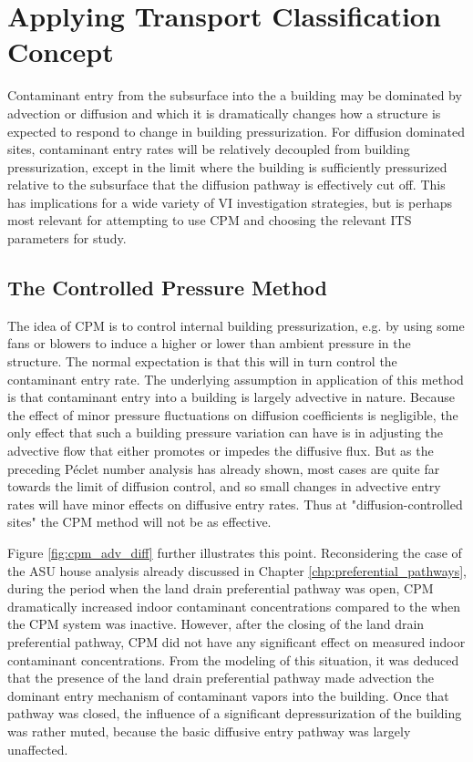 \section{Applying Transport Classification Concept}

Contaminant entry from the subsurface into the a building may be dominated by advection or diffusion and which it is dramatically changes how a structure is expected to respond to change in building pressurization.
For diffusion dominated sites, contaminant entry rates will be relatively decoupled from building pressurization, except in the limit where the building is sufficiently pressurized relative to the subsurface that the diffusion pathway is effectively cut off.
This has implications for a wide variety of VI investigation strategies, but is perhaps most relevant for attempting to use CPM and choosing the relevant ITS parameters for study.\par

\subsection{The Controlled Pressure Method}

The idea of CPM is to control internal building pressurization, e.g. by using some fans or blowers to induce a higher or lower than ambient pressure in the structure.
The normal expectation is that this will in turn control the contaminant entry rate.
The underlying assumption in application of this method is that contaminant entry into a building is largely advective in nature.
Because the effect of minor pressure fluctuations on diffusion coefficients is negligible, the only effect that such a building pressure variation can have is in adjusting the advective flow that either promotes or impedes the diffusive flux.
But as the preceding Péclet number analysis has already shown, most cases are quite far towards the limit of diffusion control, and so small changes in advective entry rates will have minor effects on diffusive entry rates.
Thus at "diffusion-controlled sites" the CPM method will not be as effective.\par

Figure \ref{fig:cpm_adv_diff} further illustrates this point.
Reconsidering the case of the ASU house analysis already discussed in Chapter \ref{chp:preferential_pathways}, during the period when the land drain preferential pathway was open, CPM dramatically increased indoor contaminant concentrations compared to the when the CPM system was inactive.
However, after the closing of the land drain preferential pathway, CPM did not have any significant effect on measured indoor contaminant concentrations.
From the modeling of this situation, it was deduced that the presence of the land drain preferential pathway made advection the dominant entry mechanism of contaminant vapors into the building.
Once that pathway was closed, the influence of a significant depressurization of the building was rather muted, because the basic diffusive entry pathway was largely unaffected.\par

